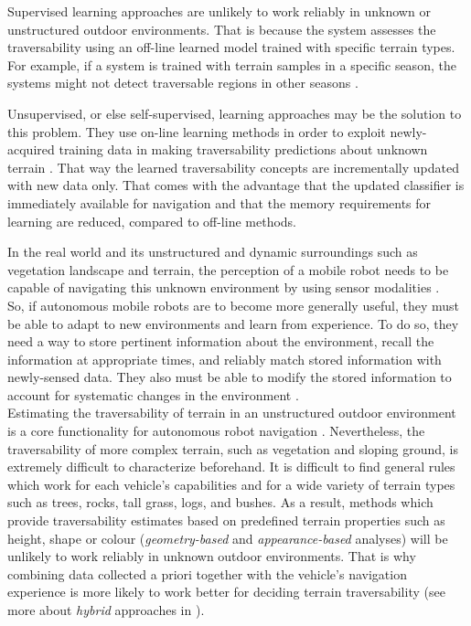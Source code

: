 \documentclass[12pt,a4paper]{report}
\newcommand{\term}{\textit}
\begin{document}
	Supervised learning approaches are unlikely to work reliably in unknown or 
	unstructured outdoor environments. That is because the system assesses the 
	traversability using an off-line learned model trained with specific 
	terrain types. For example, if a system is trained with terrain samples in a 
	specific season, the systems might not detect traversable regions in other 
	seasons \citep{Lee}.
	\par
	Unsupervised, or else self-supervised, learning approaches may be the solution 
	to this problem. They use on-line learning methods in order to exploit newly-
	acquired training data in making traversability predictions about unknown 
	terrain \citep{Kim}. That way the learned traversability concepts are 
	incrementally updated with new data only. That comes with the advantage that the 
	updated classifier is immediately available for navigation and that the memory 
	requirements for learning are reduced, compared to off-line methods.
	\par
	In the real world and its unstructured and dynamic surroundings such as vegetation 
	landscape and terrain, the perception of a mobile robot needs to be capable of 
	navigating this unknown environment by using sensor modalities \citep{Shabbir}.
	\\
	
	So, if autonomous mobile robots are to become more generally useful, they must 
	be able to adapt to new environments and learn from experience. To do so, they 
	need a way to store pertinent information about the environment, recall the 
	information at appropriate times, and reliably match stored information with 
	newly-sensed data. They also must be able to modify the stored information to 
	account for systematic changes in the environment \citep{Shneier}.
	\\
	
	Estimating the traversability of terrain in an unstructured outdoor 
	environment is a core functionality for autonomous robot navigation \citep{Kim}. 
	Nevertheless, the traversability of more complex terrain, such as 
	vegetation and sloping ground, is extremely difficult to characterize beforehand. 
	It is difficult to find general rules which work for each vehicle's	capabilities
	and for a wide variety of terrain types such as trees, rocks, tall grass, logs, 
	and bushes. As a result, methods which provide traversability estimates 
	based on predefined terrain properties such as height, shape or colour 
	(\term{geometry-based} and \term{appearance-based} analyses) will be unlikely to 
	work reliably in unknown outdoor environments. That is why combining data 
	collected a priori together with the vehicle’s navigation experience is more 
	likely to work better for deciding terrain traversability (see more about 
	\term{hybrid} approaches in \citet{Papadakis}).
	\\
	
\end{document}
